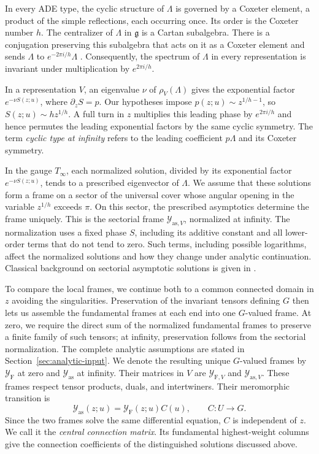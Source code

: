\documentclass[11pt,leqno]{amsart}
\numberwithin{equation}{section}
\theoremstyle{plain}
\theoremstyle{definition}
\theoremstyle{plain}
\theoremstyle{definition}
\theoremstyle{remark}
\newcommand{\g}{\mathfrak g}
\begin{document}
In every ADE type, the cyclic structure of $\Lambda$ is governed by a Coxeter element, a product of the simple reflections, each occurring once.  Its order is the Coxeter number $h$.  The centralizer of $\Lambda$ in $\g$ is a Cartan subalgebra.  There is a conjugation preserving this subalgebra that acts on it as a Coxeter element and sends $\Lambda$ to $e^{-2\pi i/h}\Lambda$ \cite{Kostant1959}.  Consequently, the spectrum of $\Lambda$ in every representation is invariant under multiplication by $e^{2\pi i/h}$.

In a representation $V$, an eigenvalue $\nu$ of $\rho_V(\Lambda)$ gives the exponential factor $e^{-\nu S(z;u)}$, where $\partial_zS=p$.  Our hypotheses impose $p(z;u)\sim z^{1/h-1}$, so $S(z;u)\sim hz^{1/h}$.  A full turn in $z$ multiplies this leading phase by $e^{2\pi i/h}$ and hence permutes the leading exponential factors by the same cyclic symmetry.  The term \emph{cyclic type at infinity} refers to the leading coefficient $p\Lambda$ and its Coxeter symmetry.

In the gauge $T_\infty$, each normalized solution, divided by its exponential factor $e^{-\nu S(z;u)}$, tends to a prescribed eigenvector of $\Lambda$.  We assume that these solutions form a frame on a sector of the universal cover whose angular opening in the variable $z^{1/h}$ exceeds $\pi$.  On this sector, the prescribed asymptotics determine the frame uniquely.  This is the sectorial frame $\mathcal Y_{\mathrm{as},V}$, normalized at infinity.  The normalization uses a fixed phase $S$, including its additive constant and all lower-order terms that do not tend to zero.  Such terms, including possible logarithms, affect the normalized solutions and how they change under analytic continuation.  Classical background on sectorial asymptotic solutions is given in \cite{Wasow1965,Sibuya1975}.

To compare the local frames, we continue both to a common connected domain in $z$ avoiding the singularities.  Preservation of the invariant tensors defining $G$ then lets us assemble the fundamental frames at each end into one $G$-valued frame.  At zero, we require the direct sum of the normalized fundamental frames to preserve a finite family of such tensors; at infinity, preservation follows from the sectorial normalization.  The complete analytic assumptions are stated in Section~\ref{sec:analytic-input}.  We denote the resulting unique $G$-valued frames by $\mathcal Y_{\mathrm F}$ at zero and $\mathcal Y_{\mathrm{as}}$ at infinity.  Their matrices in $V$ are $\mathcal Y_{\mathrm F,V}$ and $\mathcal Y_{\mathrm{as},V}$.  These frames respect tensor products, duals, and intertwiners.  Their meromorphic transition is
\[
 \mathcal Y_{\mathrm{as}}(z;u)=\mathcal Y_{\mathrm F}(z;u)C(u),
 \qquad C:U\longrightarrow G.
\]
Since the two frames solve the same differential equation, $C$ is independent of $z$.  We call it the \emph{central connection matrix}.  Its fundamental highest-weight columns give the connection coefficients of the distinguished solutions discussed above.
\end{document}
